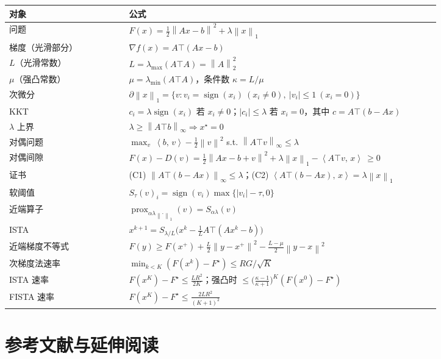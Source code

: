 \documentclass[11pt,a4paper,UTF8]{ctexart}
\theoremstyle{plain}
\theoremstyle{definition}
\theoremstyle{remark}
\newcommand{\norm}[1]{\left\lVert #1 \right\rVert}
\newcommand{\abs}[1]{\left\lvert #1 \right\rvert}
\newcommand{\inner}[2]{\left\langle #1,\, #2 \right\rangle}
\newcommand{\prox}{\operatorname{prox}}
\DeclareMathOperator{\sign}{sign}
\begin{document}
\begin{center}
\small
\begin{tabular}{@{}p{0.25\linewidth}p{0.65\linewidth}@{}}
\toprule
对象 & 公式 \\
\midrule

问题 & $F(x)=\tfrac12\norm{Ax-b}^2+\lambda\norm x_1$\\
梯度（光滑部分）& $\nabla f(x)=A\top(Ax-b)$\\
$L$（光滑常数）& $L=\lambda_{\max}(A\top A)=\norm A_2^2$\\
$\mu$（强凸常数）& $\mu=\lambda_{\min}(A\top A)$，条件数 $\kappa=L/\mu$\\
次微分 & $\partial\norm x_1=\{v:v_i=\sign(x_i)\ (x_i\neq0),\ \abs{v_i}\le1\ (x_i=0)\}$\\
KKT & $c_i=\lambda\sign(x_i)$ 若 $x_i\neq0$；$\abs{c_i}\le\lambda$ 若 $x_i=0$，其中 $c=A\top(b-Ax)$\\
$\lambda$ 上界 & $\lambda\ge\norm{A\top b}_\infty\Rightarrow x^\star=0$\\
对偶问题 & $\max_v\ \inner bv-\tfrac12\norm v^2$ s.t. $\norm{A\top v}_\infty\le\lambda$\\
对偶间隙 & $F(x)-D(v)=\tfrac12\norm{Ax-b+v}^2+\lambda\norm x_1-\inner{A\top v}{x}\ \ge0$\\
证书 & (C1) $\norm{A\top(b-Ax)}_\infty\le\lambda$；(C2) $\inner{A\top(b-Ax)}{x}=\lambda\norm x_1$\\
软阈值 & $S_\tau(v)_i=\sign(v_i)\max\{\abs{v_i}-\tau,0\}$\\
近端算子 & $\prox_{\alpha\lambda\norm\cdot_1}(v)=S_{\alpha\lambda}(v)$\\
ISTA & $x^{k+1}=S_{\lambda/L}\bigl(x^k-\tfrac1LA\top(Ax^k-b)\bigr)$\\
近端梯度不等式 & $F(y)\ge F(x^+)+\frac L2\norm{y-x^+}^2-\frac{L-\mu}{2}\norm{y-x}^2$\\
次梯度法速率 & $\min_{k<K}(F(x^k)-F^\star)\le RG/\sqrt K$\\
ISTA 速率 & $F(x^K)-F^\star\le\frac{LR^2}{2K}$；强凸时 $\le\bigl(\frac{\kappa-1}{\kappa+1}\bigr)^K(F(x^0)-F^\star)$\\
FISTA 速率 & $F(x^K)-F^\star\le\frac{2LR^2}{(K+1)^2}$\\
\bottomrule
\end{tabular}
\end{center}

\section{参考文献与延伸阅读}
\end{document}
